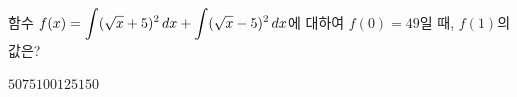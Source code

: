 함수 $f(x)=\displaystyle\int (\sqrt{x}+5)^2\mkern3mu dx+\int (\sqrt{x}-5)^2\mkern3mu dx$에 대하여 $f(0)=49$일 때, $f(1)$의 값은?
\begin{choices32}{$50$}{$75$}{$100$}{$125$}{$150$}\end{choices32}
